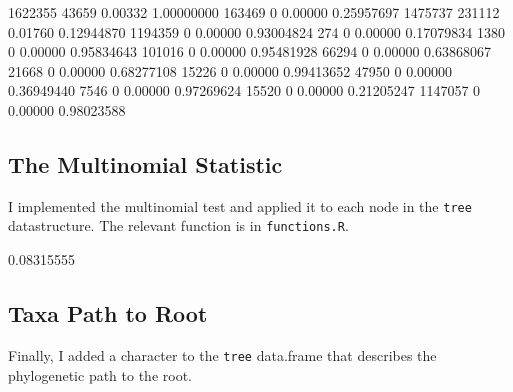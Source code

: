 \documentclass{article}
\begin{document}
\begin{Schunk}
\begin{Soutput}
1622355              43659           0.00332     1.00000000
163469                   0           0.00000     0.25957697
1475737             231112           0.01760     0.12944870
1194359                  0           0.00000     0.93004824
274                      0           0.00000     0.17079834
1380                     0           0.00000     0.95834643
101016                   0           0.00000     0.95481928
66294                    0           0.00000     0.63868067
21668                    0           0.00000     0.68277108
15226                    0           0.00000     0.99413652
47950                    0           0.00000     0.36949440
7546                     0           0.00000     0.97269624
15520                    0           0.00000     0.21205247
1147057                  0           0.00000     0.98023588
\end{Soutput}
\end{Schunk}


\subsection{The Multinomial Statistic}


I implemented the multinomial test and applied it to each node in the {\tt tree} datastructure. 
The relevant function is in {\tt functions.R}.
\begin{Schunk}
\begin{Soutput}
[1] 0.08315555
\end{Soutput}
\end{Schunk}



\subsection{Taxa Path to Root}

Finally, I added a character to the {\tt tree} data.frame that describes the phylogenetic path to the root.
\begin{Schunk}
\end{Schunk}
\end{document}

